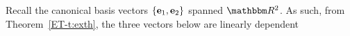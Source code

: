 \begin{frame}

    \vspace{2em}
    \Eg
    Recall the canonical basis vectors
    $\{{\mathbf e}_1, {\mathbf e}_2\}$ spanned $\RR^2$. As such, from Theorem~\ref{ET-t:exth}, 
    the three vectors below are linearly dependent 
    \begin{figure}
       \begin{center}
       \end{center}
    \end{figure}
    
\end{frame}


